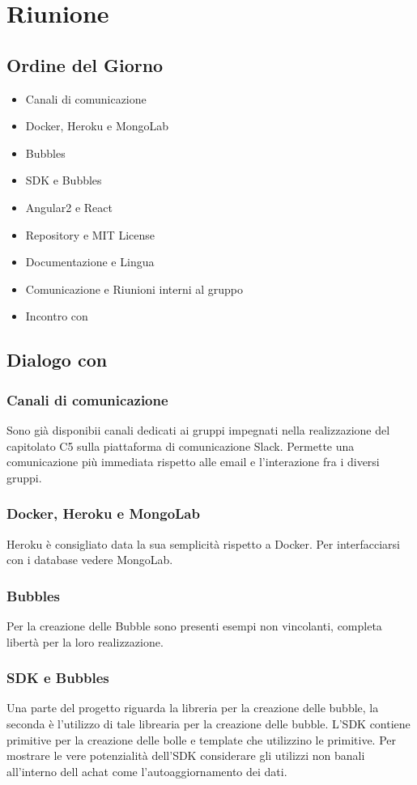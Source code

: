 \section{Riunione}
\subsection{Ordine del Giorno}
\begin{itemize}
	\item Canali di comunicazione
	\item Docker, Heroku e MongoLab
	\item Bubbles
	\item SDK e Bubbles
	\item Angular2 e React
	\item Repository e MIT License
	\item Documentazione e Lingua
	\item Comunicazione e Riunioni interni al gruppo \GroupName
	\item Incontro con \Proponente	
\end{itemize}

\subsection{Dialogo con \Proponente}
\subsubsection{Canali di comunicazione}
Sono già disponibii canali dedicati ai gruppi impegnati nella realizzazione del capitolato C5 sulla piattaforma di comunicazione Slack. Permette una comunicazione più immediata rispetto alle email e l'interazione fra i diversi gruppi.

\subsubsection{Docker, Heroku e MongoLab}
Heroku è consigliato data la sua semplicità rispetto a Docker. 
Per interfacciarsi con i database vedere MongoLab.

\subsubsection{Bubbles}
Per la creazione delle Bubble sono presenti esempi non vincolanti, completa libertà per la loro realizzazione.

\subsubsection{SDK e Bubbles}
Una parte del progetto riguarda la libreria per la creazione delle bubble, la seconda è l'utilizzo di tale librearia per la creazione delle bubble. L'SDK contiene primitive per la creazione delle bolle e template che utilizzino le primitive.
Per mostrare le vere potenzialità dell'SDK considerare gli utilizzi non banali all'interno dell achat come l'autoaggiornamento dei dati.

